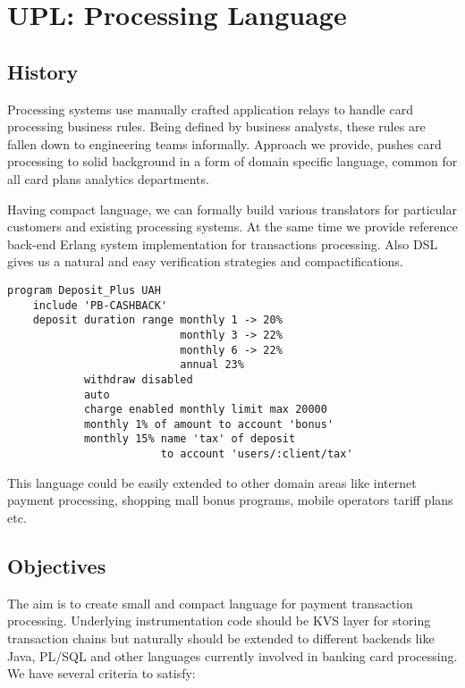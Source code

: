 \section{UPL: Processing Language}

\subsection{History}

Processing systems use manually crafted application
relays to handle card processing business rules. Being defined by business
analysts, these rules are fallen down to engineering teams informally.
Approach we provide, pushes card processing to solid background in a form
of domain specific language, common for all card plans analytics departments.

Having compact language, we can formally build various translators
for particular customers and existing processing systems. At the same time
we provide reference back-end Erlang system implementation
for transactions processing. Also DSL gives us a natural and easy
verification strategies and compactifications.

\vspace{1\baselineskip}
\begin{lstlisting}[caption=Deposit Program]
    program Deposit_Plus UAH
    include 'PB-CASHBACK'
    deposit duration range monthly 1 -> 20%
                           monthly 3 -> 22%
                           monthly 6 -> 22%
                           annual 23%
            withdraw disabled
            auto
            charge enabled monthly limit max 20000
            monthly 1% of amount to account 'bonus'
            monthly 15% name 'tax' of deposit
                        to account 'users/:client/tax'
\end{lstlisting}
\vspace{1\baselineskip}

This language could be easily extended to other domain areas like
internet payment processing, shopping mall bonus programs, mobile
operators tariff plans etc.

\newpage
\subsection{Objectives}

The aim is to create small and compact language for payment
transaction processing. Underlying instrumentation
code should be KVS layer for storing transaction chains but
naturally should be extended to different backends like Java,
PL/SQL and other languages currently involved in banking card processing.
We have several criteria to satisfy:

